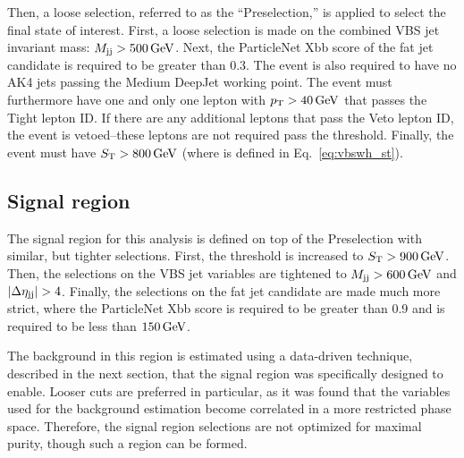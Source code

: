 Then, a loose selection, referred to as the ``Preselection,'' is applied to select the final state of interest. 
First, a loose selection is made on the combined VBS jet invariant mass: $M_{\mathrm{j}\mathrm{j}} > 500\,\text{Ge\hspace{-.08em}V}$.
Next, the ParticleNet Xbb score of the \Htobb fat jet candidate is required to be greater than 0.3.
The event is also required to have no AK4 jets passing the Medium DeepJet working point.
The event must furthermore have one and only one lepton with $p_{\mathrm{T}} > 40\,\text{Ge\hspace{-.08em}V}$ that passes the Tight lepton ID. 
If there are any additional leptons that pass the Veto lepton ID, the event is vetoed--these leptons are not required pass the \pt threshold. 
Finally, the event must have $S_{\mathrm{T}} > 800\,\text{Ge\hspace{-.08em}V}$ (where \ST is defined in Eq.~\ref{eq:vbswh_st}).

\subsection{Signal region}
The signal region for this analysis is defined on top of the Preselection with similar, but tighter selections. 
First, the \ST threshold is increased to $S_{\mathrm{T}} > 900 \,\text{Ge\hspace{-.08em}V}$. 
Then, the selections on the VBS jet variables are tightened to $M_{\mathrm{j}\mathrm{j}} > 600 \,\text{Ge\hspace{-.08em}V}$ and $|\Delta\eta_{\mathrm{j}\mathrm{j}}| > 4$. 
Finally, the selections on the \Htobb fat jet candidate are made much more strict, where the ParticleNet Xbb score is required to be greater than 0.9 and \MSD is required to be less than $150 \,\text{Ge\hspace{-.08em}V}$. 

The background in this region is estimated using a data-driven technique, described in the next section, that the signal region was specifically designed to enable. 
Looser cuts are preferred in particular, as it was found that the variables used for the background estimation become correlated in a more restricted phase space. 
Therefore, the signal region selections are not optimized for maximal purity, though such a region can be formed. 


